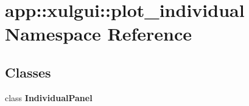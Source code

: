 \section{app::xulgui::plot\_\-individual Namespace Reference}
\label{namespaceapp_1_1xulgui_1_1plot__individual}


\subsection*{Classes}
\begin{CompactItemize}
\item 
class {\bf IndividualPanel}
\end{CompactItemize}
